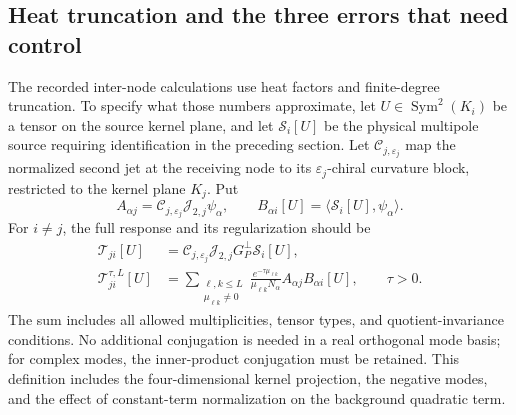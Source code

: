 \documentclass[a4paper,11pt]{article}
\numberwithin{equation}{section}
\theoremstyle{definition}
\begin{document}
\subsection{Heat truncation and the three errors that need control}\label{sec:spectralerrors}
The recorded inter-node calculations use heat factors and finite-degree truncation. To specify what those numbers approximate,
let $U\in\operatorname{Sym}^2(K_i)$ be a tensor on the source kernel plane,
and let $\mathcal S_i[U]$ be the physical multipole source requiring identification in the preceding section.
Let $\mathscr C_{j,\varepsilon_j}$ map the normalized second jet at the receiving node to its
$\varepsilon_j$-chiral curvature block, restricted to the kernel plane $K_j$. Put
\[
A_{\alpha j}=\mathscr C_{j,\varepsilon_j}\mathcal J_{2,j}\psi_\alpha,
\qquad B_{\alpha i}[U]=\langle\mathcal S_i[U],\psi_\alpha\rangle.
\]
For $i\ne j$, the full response and its regularization should be
\begin{align}
\mathcal T_{ji}[U]&=
\mathscr C_{j,\varepsilon_j}\mathcal J_{2,j}G_P^\perp\mathcal S_i[U],\nonumber\\
\mathcal T_{ji}^{\tau,L}[U]&=
\sum_{\substack{\ell,k\le L\\\mu_{\ell k}\ne0}}
\frac{e^{-\tau\mu_{\ell k}}}{\mu_{\ell k}N_\alpha}
A_{\alpha j}B_{\alpha i}[U],\qquad\tau>0.\label{eq:heat-response}
\end{align}
The sum includes all allowed multiplicities, tensor types, and quotient-invariance conditions.
No additional conjugation is needed in a real orthogonal mode basis; for complex modes, the inner-product conjugation must be retained.
This definition includes the four-dimensional kernel projection, the negative modes, and the effect of constant-term normalization on the background quadratic term.
\end{document}
